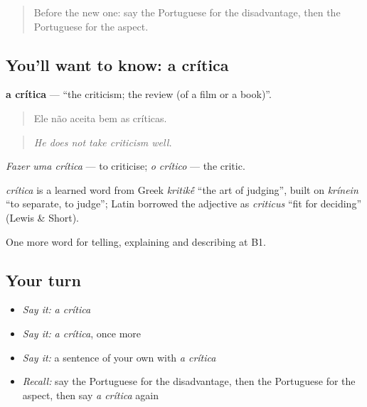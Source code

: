 \label{lesson:PT-C345-critica}



\begin{quote}
Before the new one: say the Portuguese for the disadvantage, then the Portuguese for the aspect.
\end{quote}

\subsection*{You'll want to know: a crítica}
\textbf{a crítica} — \textquotedblleft{}the criticism; the review (of a film or a book)\textquotedblright{}.

\begin{quote}
Ele não aceita bem as críticas.
\end{quote}

\begin{quote}
\emph{He does not take criticism well.}
\end{quote}

\emph{Fazer uma crítica} — to criticise; \emph{o crítico} — the critic.

\begin{cousinweb}
\emph{crítica} is a learned word from Greek \emph{kritik\'{\={e}}} \textquotedblleft{}the art of judging\textquotedblright{}, built on \emph{krínein} \textquotedblleft{}to separate, to judge\textquotedblright{}; Latin borrowed the adjective as \emph{criticus} \textquotedblleft{}fit for deciding\textquotedblright{} (Lewis \& Short).
\end{cousinweb}

\begin{grammarlens}[title={What you've built}]
One more word for telling, explaining and describing at B1.
\end{grammarlens}

\subsection*{Your turn}
\begin{itemize}
\raggedright
  \item \emph{Say it:} \emph{a crítica}
  \item \emph{Say it:} \emph{a crítica}, once more
  \item \emph{Say it:} a sentence of your own with \emph{a crítica}
  \item \emph{Recall:} say the Portuguese for the disadvantage, then the Portuguese for the aspect, then say \emph{a crítica} again
\end{itemize}

